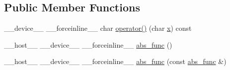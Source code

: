 \subsection*{Public Member Functions}
\begin{DoxyCompactItemize}
\item 
\-\_\-\-\_\-device\-\_\-\-\_\- \-\_\-\-\_\-forceinline\-\_\-\-\_\- char \hyperlink{structcv_1_1gpu_1_1device_1_1abs__func_3_01char_01_4_a5b3e4075f4c6da65ca1967edf82b7ab1}{operator()} (char \hyperlink{highgui__c_8h_a6150e0515f7202e2fb518f7206ed97dc}{x}) const 
\item 
\-\_\-\-\_\-host\-\_\-\-\_\- \-\_\-\-\_\-device\-\_\-\-\_\- \-\_\-\-\_\-forceinline\-\_\-\-\_\- \hyperlink{structcv_1_1gpu_1_1device_1_1abs__func_3_01char_01_4_a9f752fe3fc3005356f9c57f67b368d28}{abs\-\_\-func} ()
\item 
\-\_\-\-\_\-host\-\_\-\-\_\- \-\_\-\-\_\-device\-\_\-\-\_\- \-\_\-\-\_\-forceinline\-\_\-\-\_\- \hyperlink{structcv_1_1gpu_1_1device_1_1abs__func_3_01char_01_4_ad3166a0de1ae9da09ba4e93be737d136}{abs\-\_\-func} (const \hyperlink{structcv_1_1gpu_1_1device_1_1abs__func}{abs\-\_\-func} \&)
\end{DoxyCompactItemize}


